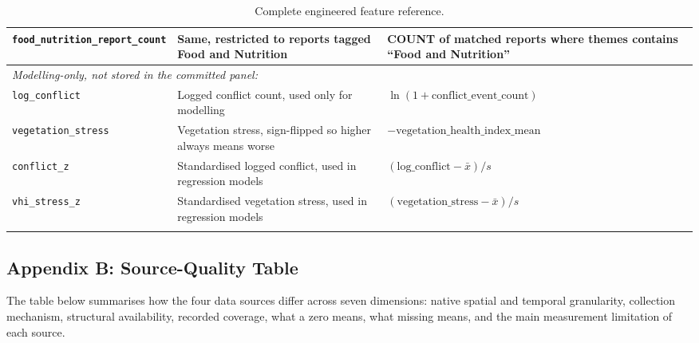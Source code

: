 \documentclass[12pt,a4paper]{article}
\begin{document}
\begin{longtable}{p{4cm}p{4.3cm}p{5.7cm}}
\texttt{food\-\_nutrition\-\_report\-\_count} & Same, restricted to reports tagged Food and Nutrition & COUNT of matched reports where themes contains ``Food and Nutrition'' \\
\midrule
\multicolumn{3}{l}{\textit{Modelling-only, not stored in the committed panel:}} \\
\texttt{log\_conflict} & Logged conflict count, used only for modelling & $\ln(1+\text{conflict\_event\_count})$ \\
\texttt{vegetation\_stress} & Vegetation stress, sign-flipped so higher always means worse & $-\text{vegetation\_health\_index\_mean}$ \\
\texttt{conflict\_z} & Standardised logged conflict, used in regression models & $(\text{log\_conflict} - \bar{x})/s$ \\
\texttt{vhi\_stress\_z} & Standardised vegetation stress, used in regression models & $(\text{vegetation\_stress} - \bar{x})/s$ \\
\bottomrule
\caption{Complete engineered feature reference.} \label{tab:appA} \\
\end{longtable}

\subsection*{Appendix B: Source-Quality Table}

The table below summarises how the four data sources differ across seven dimensions: native spatial and temporal granularity, collection mechanism, structural availability, recorded coverage, what a zero means, what missing means, and the main measurement limitation of each source.
\end{document}
